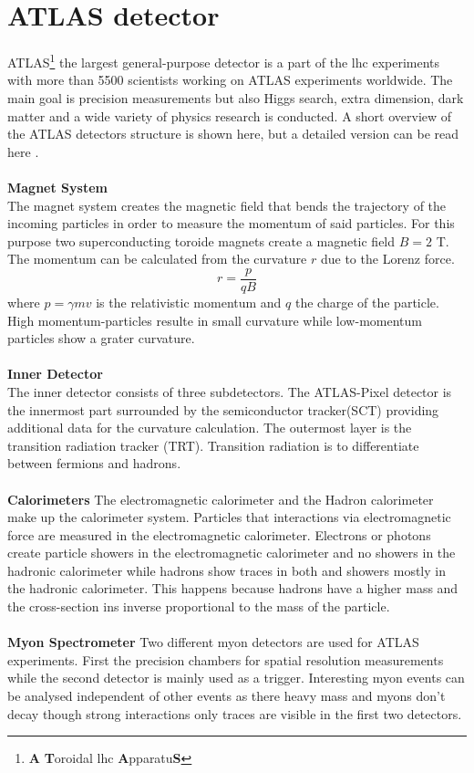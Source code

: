 \documentclass[../Bachelorarbeit.tex]{subfiles}
\begin{document}
\section{ATLAS detector}
ATLAS\footnote{\textbf{A} \textbf{T}oroidal \acrshort{lhc} \textbf{A}pparatu\textbf{S}} the largest general-purpose detector is a part of the \acrshort{lhc} experiments with more than 5500 scientists working on
ATLAS experiments worldwide. The main goal is precision measurements but also Higgs search, extra dimension, dark matter and a wide variety of physics research is conducted.
A short overview of the ATLAS detectors structure is shown here, but a detailed version can be read here \cite{Evans.2008}.
\\\\
\textbf{Magnet System}\\
The magnet system creates the magnetic field that bends the trajectory of the incoming particles in order to measure the momentum of said particles.
For this purpose two superconducting toroide magnets create a magnetic field $B=2$ T. The momentum can be calculated from the curvature $r$ due to the Lorenz force.
\begin{equation}
    r=\frac{p}{q B}
\end{equation}
where $p=\gamma m v$ is the relativistic momentum and $q$ the charge of the particle. High momentum-particles resulte in small curvature while low-momentum particles show a grater curvature.
\\\\
\textbf{Inner Detector}\\
The inner detector consists of three subdetectors. The ATLAS-Pixel detector is the innermost part surrounded by the semiconductor tracker(SCT) providing additional data for the curvature calculation.
The outermost layer is the transition radiation tracker (TRT). Transition radiation is to differentiate between fermions and hadrons.
\\\\
\textbf{Calorimeters}
The electromagnetic calorimeter and the Hadron calorimeter make up the calorimeter system. Particles that interactions via electromagnetic force are measured in
the electromagnetic calorimeter. Electrons or photons create particle showers in the electromagnetic calorimeter and no showers in the hadronic calorimeter while hadrons show traces in both and showers mostly in the hadronic calorimeter.
This happens because hadrons have a higher mass and the cross-section ins inverse proportional to the mass of the particle.
\\\\
\textbf{Myon Spectrometer}
Two different myon detectors are used for ATLAS experiments. First the precision chambers for spatial resolution measurements while the second detector is mainly used as a trigger. Interesting myon events can be analysed
independent of other events as there heavy mass and myons don't decay though strong interactions only traces are visible in the first two detectors.
\end{document}
